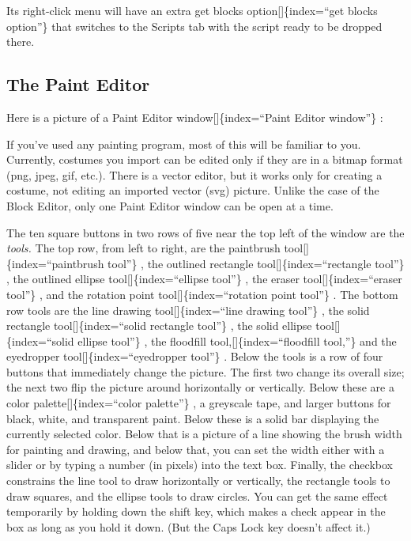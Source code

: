 \documentclass[
  letterpaper,
]{book}
\begin{document}
Its right-click menu will have an extra get blocks
option{[}{]}\{index=``get blocks option''\} that switches to the Scripts
tab with the script ready to be dropped there.

\subsection{The Paint Editor}\label{the-paint-editor}

Here is a picture of a Paint Editor window{[}{]}\{index=``Paint Editor
window''\} :

If you've used any painting program, most of this will be familiar to
you. Currently, costumes you import can be edited only if they are in a
bitmap format (png, jpeg, gif, etc.). There is a vector editor, but it
works only for creating a costume, not editing an imported vector (svg)
picture. Unlike the case of the Block Editor, only one Paint Editor
window can be open at a time.

The ten square buttons in two rows of five near the top left of the
window are the \emph{tools.} The top row, from left to right, are the
paintbrush tool{[}{]}\{index=``paintbrush tool''\} , the outlined
rectangle tool{[}{]}\{index=``rectangle tool''\} , the outlined ellipse
tool{[}{]}\{index=``ellipse tool''\} , the eraser
tool{[}{]}\{index=``eraser tool''\} , and the rotation point
tool{[}{]}\{index=``rotation point tool''\} . The bottom row tools are
the line drawing tool{[}{]}\{index=``line drawing tool''\} , the solid
rectangle tool{[}{]}\{index=``solid rectangle tool''\} , the solid
ellipse tool{[}{]}\{index=``solid ellipse tool''\} , the floodfill
tool,{[}{]}\{index=``floodfill tool,''\} and the eyedropper
tool{[}{]}\{index=``eyedropper tool''\} . Below the tools is a row of
four buttons that immediately change the picture. The first two change
its overall size; the next two flip the picture around horizontally or
vertically. Below these are a color palette{[}{]}\{index=``color
palette''\} , a greyscale tape, and larger buttons for black, white, and
transparent paint. Below these is a solid bar displaying the currently
selected color. Below that is a picture of a line showing the brush
width for painting and drawing, and below that, you can set the width
either with a slider or by typing a number (in pixels) into the text
box. Finally, the checkbox constrains the line tool to draw horizontally
or vertically, the rectangle tools to draw squares, and the ellipse
tools to draw circles. You can get the same effect temporarily by
holding down the shift key, which makes a check appear in the box as
long as you hold it down. (But the Caps Lock key doesn't affect it.)
\end{document}

